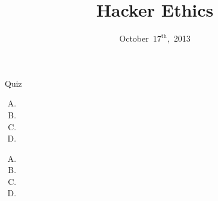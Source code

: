 \documentclass{beamer}
\title{Hacker Ethics}
\date{October~$17^{\text{th}}$,~2013}
\begin{document}
\begin{frame}
\titlepage
\end{frame}

\begin{frame}{Quiz}

\begin{enumerate}[(A)]
\item<1-2>
\item<1>
\item<1>
\item<1>
\end{enumerate}

\begin{enumerate}[(A)]
\item<1-2>
\item<1>
\item<1>
\item<1>
\end{enumerate}
\end{frame}
\end{document}
